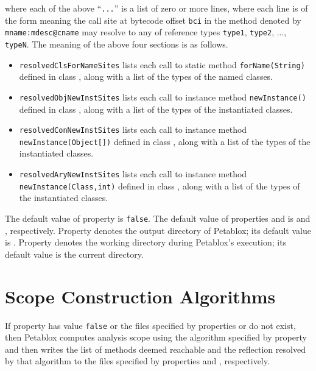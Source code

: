 where each of the above ``{\tt ...}'' is a list of zero or more lines, where
each line is of the form
meaning the call site at bytecode offset {\tt bci} in the
method denoted by {\tt mname:mdesc@cname} may resolve to any of
reference types {\tt type1}, {\tt type2}, ..., {\tt typeN}.
The meaning of the above four sections is as follows.
\begin{itemize}
\item {\tt resolvedClsForNameSites} lists
each call to static method {\tt forName(String)} defined in class
, along with a list of the types of the named
classes.
\item {\tt resolvedObjNewInstSites} lists
each call to instance method {\tt newInstance()} defined in class
, along with a list of the types of the
instantiated classes.
\item {\tt resolvedConNewInstSites} lists
each call to instance method {\tt newInstance(Object[])} defined in class
, along with a list of the types of the
instantiated classes.
\item {\tt resolvedAryNewInstSites} lists
each call to instance method {\tt newInstance(Class,int)} defined in class
, along with a list of the types of the
instantiated classes.
\end{itemize}
The default value of property  is {\tt false}.
The default value of properties  and
 is  and
, respectively.
Property  denotes the output directory of Petablox;
its default value is .
Property  denotes the working directory during
Petablox's execution; its default value is the current directory.

\section{Scope Construction Algorithms}
\label{sec:scope-algos}

If property  has value {\tt false} or the
files specified by properties  or
 do not exist, then Petablox computes analysis
scope using the algorithm specified by property
 and then writes the list of methods deemed
reachable and the reflection resolved by that algorithm to the files
specified by properties  and
, respectively.

